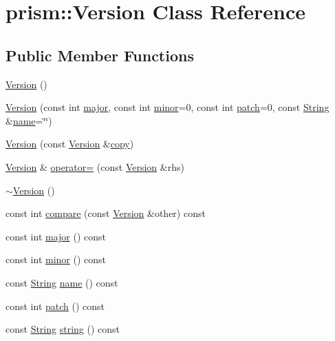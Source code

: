 \hypertarget{classprism_1_1_version}{}\section{prism\+:\+:Version Class Reference}
\label{classprism_1_1_version}
\subsection*{Public Member Functions}
\begin{DoxyCompactItemize}
\item 
\hyperlink{classprism_1_1_version_ae2da1fc0f1f60e5e2f609ba2dd9753b7}{Version} ()
\item 
\hyperlink{classprism_1_1_version_a3dacb7722eb1b4a27fb349ba391e8295}{Version} (const int \hyperlink{classprism_1_1_version_a373041add8829a55076f30000ea451d4}{major}, const int \hyperlink{classprism_1_1_version_a82875687fdccdd2dd21bbc3670155eff}{minor}=0, const int \hyperlink{classprism_1_1_version_a17955535cf1db726a3a72d0a6889c0b3}{patch}=0, const \hyperlink{classprism_1_1_string}{String} \&\hyperlink{classprism_1_1_version_a8b96b590aae378acb2a19a8259fa72de}{name}=\char`\"{}\char`\"{})
\item 
\hyperlink{classprism_1_1_version_ae4867b833f05cd7fc564f43937c4def0}{Version} (const \hyperlink{classprism_1_1_version}{Version} \&\hyperlink{namespaceprism_ae776f4cd825f79e7af1cf6ee1d90a209}{copy})
\item 
\hyperlink{classprism_1_1_version}{Version} \& \hyperlink{classprism_1_1_version_ac49ef178d92e7c3203b67fdb9a4da870}{operator=} (const \hyperlink{classprism_1_1_version}{Version} \&rhs)
\item 
\hyperlink{classprism_1_1_version_a7f37e8df82801d5e3efdc737104919af}{$\sim$\+Version} ()
\item 
const int \hyperlink{classprism_1_1_version_a34ab9ec7bde23621c26fe96c63c94328}{compare} (const \hyperlink{classprism_1_1_version}{Version} \&other) const 
\item 
const int \hyperlink{classprism_1_1_version_a373041add8829a55076f30000ea451d4}{major} () const 
\item 
const int \hyperlink{classprism_1_1_version_a82875687fdccdd2dd21bbc3670155eff}{minor} () const 
\item 
const \hyperlink{classprism_1_1_string}{String} \hyperlink{classprism_1_1_version_a8b96b590aae378acb2a19a8259fa72de}{name} () const 
\item 
const int \hyperlink{classprism_1_1_version_a17955535cf1db726a3a72d0a6889c0b3}{patch} () const 
\item 
const \hyperlink{classprism_1_1_string}{String} \hyperlink{classprism_1_1_version_a8d72cb677353e228934c760469c8a609}{string} () const 
\end{DoxyCompactItemize}

